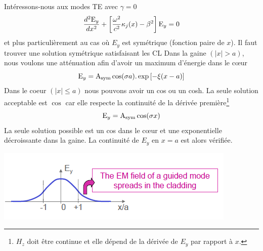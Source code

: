 Intéressons-nous aux modes TE avec $\gamma=0$
\begin{equation}
\frac{{{d^2}{{\rm{E}}_y}}}{{d{x^2}}} + \left[ {\frac{{{\omega ^2}}}{{{c^2}}}{\kappa _j}(x) - {\beta ^2}} \right]{{\rm{E}}_y} = 0
\end{equation}
et plus particulièrement au cas où $E_y$ est symétrique (fonction paire de $x$). Il faut trouver une
solution symétrique satisfaisant les CL Dans la gaine $(|x|>a)$, nous voulons une atténuation afin d'avoir un maximum d'énergie dans le cœur
\begin{equation}
{{\rm{E}}_y} = {{\rm{A}}_{{\rm{sym}}}}\cos (\sigma a).\exp \left[ { - \xi (x - a)} \right]
\end{equation}
Dans le coeur $(|x|\leq a)$ nous pouvons avoir un cos ou un cosh. La seule solution acceptable est 
$\cos$ car elle respecte la continuité de la dérivée première\footnote{$H_z$ doit être continue et
elle dépend de la dérivée de $E_y$ par rapport à $x$.}
\begin{equation}
{{\rm{E}}_y} = {{\rm{A}}_{{\rm{sym}}}}\cos (\sigma x)
\end{equation}
La seule solution possible est un cos dans le cœur et une exponentielle décroissante dans la gaine. 
La continuité de $E_y$ en $x=a$ est alors vérifiée. 
\begin{center}
	\includegraphics[scale=0.75]{ch1/image13}
\end{center}

